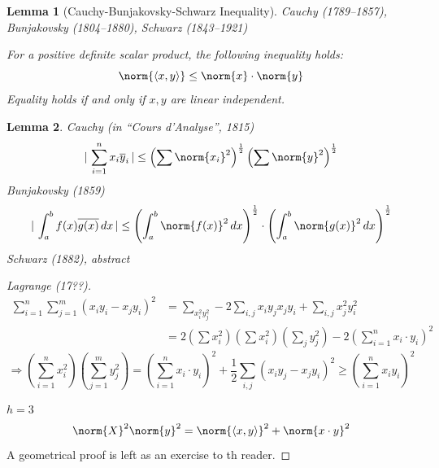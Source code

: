 \documentclass[a4paper,landscape,twocolumn]{article}
\newcommand\abs[1]{|\,#1\,|}
\newcommand\functional[1]{\left\langle{#1}\right\rangle}
\newtheorem{lemma}{Lemma}
\DeclarePairedDelimiter\norm\lVert\rVert
\begin{document}
\begin{lemma}[Cauchy-Bunjakovsky-Schwarz Inequality]
  \label{lemma-8.20}
  Cauchy (1789--1857), Bunjakovsky (1804--1880), Schwarz (1843--1921)

  For a positive definite scalar product, the following inequality holds:
  \[ \norm{\functional{x,y}} \leq \norm{x} \cdot \norm{y} \]
  Equality holds if and only if $x,y$ are linear independent.
\end{lemma}

\begin{lemma}
  Cauchy (in \enquote{Cours d'Analyse}, 1815)
  \[ \abs{\sum_{i=1}^n x_i \overline{y}_i} \leq \left(\sum \norm{x_i}^2\right)^{\frac 12} \left(\sum \norm{y}^2\right)^{\frac 12} \]
  Bunjakovsky (1859)
  \[
    \abs{\int_a^b f(x) \overline{g(x)} \, dx}
    \leq \left(\int_a^b \norm{f(x)}^2 \, dx\right)^{\frac 12} \cdot \left(\int_a^b \norm{g(x)}^2 \, dx\right)^{\frac 12}
  \]
  Schwarz (1882), abstract
\end{lemma}

\begin{proof}[Lagrange (17??)]
  \begin{align*}
    \sum_{i=1}^n \sum_{j=1}^m (x_i y_i - x_j y_i)^2
      &= \sum_{x_i^2 y_j^2} - 2 \sum_{i,j} x_i y_j x_j y_i + \sum_{i,j} x_j^2 y_i^2 \\
      &= 2 \left(\sum x_i^2\right) \left(\sum x_i^2\right) \left(\sum_j y_j^2\right) - 2 \left(\sum_{i=1}^n x_i \cdot y_i\right)^2
  \end{align*}
  \[ \Rightarrow \left(\sum_{i=1}^n x_i^2\right) \left(\sum_{j=1}^m y_j^2\right) = \left(\sum_{i=1}^n x_i \cdot y_i\right)^2 + \frac12
    \sum_{i,j} \left(x_i y_j - x_j y_i\right)^2 \geq \left(\sum_{i=1}^n x_i y_i\right)^2
  \]

  $h=3$
  \[ \norm{X}^2 \norm{y}^2 = \norm{\functional{x,y}}^2 + \norm{x \cdot y}^2 \]
  A geometrical proof is left as an exercise to th reader.
\end{proof}
\end{document}
